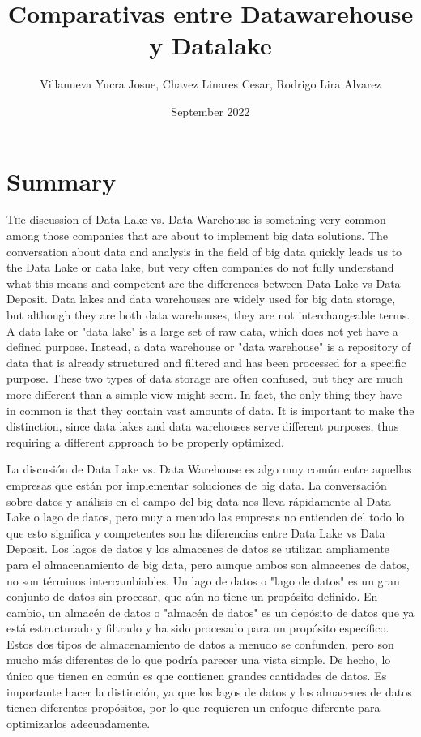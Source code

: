 \documentclass[twocolumn]{article}
\title{ Comparativas entre Datawarehouse y Datalake}
\author{Villanueva Yucra Josue, Chavez Linares Cesar, Rodrigo Lira Alvarez}
\date{September 2022}
\begin{document}
\maketitle

\section{Summary}

\lettrine[nindent=0em,lines=3]{T}he discussion of Data Lake vs. Data Warehouse is something very common among those companies that are about to implement big data solutions. The conversation about data and analysis in the field of big data quickly leads us to the Data Lake or data lake, but very often companies do not fully understand what this means and competent are the differences between Data Lake vs Data Deposit.
Data lakes and data warehouses are widely used for big data storage, but although they are both data warehouses, they are not interchangeable terms. A data lake or "data lake" is a large set of raw data, which does not yet have a defined purpose. Instead, a data warehouse or "data warehouse" is a repository of data that is already structured and filtered and has been processed for a specific purpose.
These two types of data storage are often confused, but they are much more different than a simple view might seem. In fact, the only thing they have in common is that they contain vast amounts of data.
It is important to make the distinction, since data lakes and data warehouses serve different purposes, thus requiring a different approach to be properly optimized.

\vspace{0.5cm}

 \noindent La discusión de Data Lake vs. Data Warehouse es algo muy común entre aquellas empresas que están por implementar soluciones de big data. La conversación sobre datos y análisis en el campo del big data nos lleva rápidamente al Data Lake o lago de datos, pero muy a menudo las empresas no entienden del todo lo que esto significa y competentes son las diferencias entre Data Lake vs Data Deposit.
Los lagos de datos y los almacenes de datos se utilizan ampliamente para el almacenamiento de big data, pero aunque ambos son almacenes de datos, no son términos intercambiables. Un lago de datos o "lago de datos" es un gran conjunto de datos sin procesar, que aún no tiene un propósito definido. En cambio, un almacén de datos o "almacén de datos" es un depósito de datos que ya está estructurado y filtrado y ha sido procesado para un propósito específico.
Estos dos tipos de almacenamiento de datos a menudo se confunden, pero son mucho más diferentes de lo que podría parecer una vista simple. De hecho, lo único que tienen en común es que contienen grandes cantidades de datos.
Es importante hacer la distinción, ya que los lagos de datos y los almacenes de datos tienen diferentes propósitos, por lo que requieren un enfoque diferente para optimizarlos adecuadamente.
\end{document}
